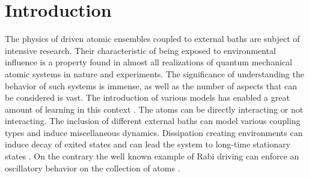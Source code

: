 \chapter{Introduction}
The physics of driven atomic ensembles coupled to external baths are subject of intensive research. Their characteristic of being exposed to environmental influence is a property found in almost all realizations of quantum mechanical atomic systems in nature and experiments. The significance of understanding the behavior of such systems is immense, as well as the number of aspects that can be considered is vast. The introduction of various models has enabled a great amount of learning in this context \cite{diehl_quantum_2008,diehl_dynamical_2010,cabot_metastable_2022,mattes_entangled_2023,krishna_measurement-induced_2023,jin_photon_2013,marcuzzi_absorbing_2016}. The atoms can be directly interacting or not interacting. The inclusion of different external baths can model various coupling types and induce miscellaneous dynamics. Dissipation creating environments can induce decay of exited states and can lead the system to long-time stationary states \cite{camalet_non-equilibrium_2011,huangfu_steady_2018}. On the contrary the well known example of Rabi driving \cite{rabi_space_1937} can enforce an oscillatory behavior on the collection of atoms \cite{dudin_observation_2012}.


